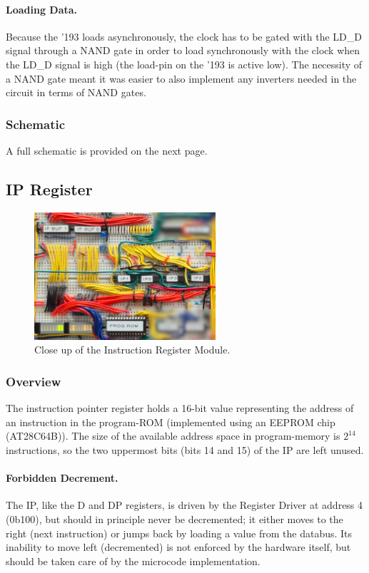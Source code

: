 \paragraph{Loading Data.} Because the '193 loads asynchronously, the clock has to be gated with the LD\_D signal through a NAND gate in order to load synchronously with the clock when the LD\_D signal is high (the load-pin on the '193 is active low). The necessity of a NAND gate meant it was easier to also implement any inverters needed in the circuit in terms of NAND gates.


\subsubsection{Schematic}
A full schematic is provided on the next page.



\subsection{IP Register}
\begin{figure}[H]
  \centering
  \includegraphics[width=0.6\textwidth]{img/ipregistercloseup}
  \caption{Close up of the Instruction Register Module.}
  \label{fig:iregcloseup}
\end{figure}

\subsubsection{Overview}
The instruction pointer register holds a 16-bit value representing the address of an instruction in the program-ROM (implemented using an EEPROM chip (AT28C64B)). The size of the available address space in program-memory is $2^{14}$ instructions, so the two uppermost bits (bits 14 and 15) of the IP are left unused.

\paragraph{Forbidden Decrement.} The IP, like the D and DP registers, is driven by the Register Driver at address 4 (0b100), but should in principle never be decremented; it either moves to the right (next instruction) or jumps back by loading a value from the databus. Its inability to move left (decremented) is not enforced by the hardware itself, but should be taken care of by the microcode implementation.

